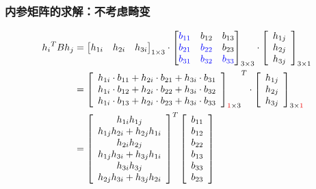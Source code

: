 \documentclass[aspectratio=43]{beamer}
\begin{document}
	\begin{frame}
		\frametitle{内参矩阵的求解：不考虑畸变}
		\begin{align}
			{h_i}^TBh_j&=\left[ \begin{matrix}
				h_{1i}&		h_{2i}&		h_{3i}\\
			\end{matrix} \right] _{1\times 3}\cdot \left[ \begin{matrix}
				{\color{blue} b_{11}}&		b_{12}&		b_{13}\\
				{\color{blue} b_{21}}&		{\color{blue} b_{22}}&		b_{23}\\
				{\color{blue} b_{31}}&		{\color{blue} b_{32}}&		{\color{blue} b_{33}}\\
			\end{matrix} \right] _{3\times 3}\cdot \left[ \begin{array}{c}
				h_{1j}\\
				h_{2j}\\
				h_{3j}\\
			\end{array} \right] _{3\times 1} \nonumber
			\\
			&	={\left[ \begin{array}{c}
					h_{1i}\cdot b_{11}+h_{2i}\cdot b_{21}+h_{3i}\cdot b_{31}\\
					h_{1i}\cdot b_{12}+h_{2i}\cdot b_{22}+h_{3i}\cdot b_{32}\\
					h_{1i}\cdot b_{13}+h_{2i}\cdot b_{23}+h_{3i}\cdot b_{33}\\
				\end{array} \right] _{{\color[RGB]{240, 0, 0} 1}\times 3}}^T\cdot \left[ \begin{array}{c}
				h_{1j}\\
				h_{2j}\\
				h_{3j}\\
			\end{array} \right] _{3\times {\color[RGB]{240, 0, 0} 1}} \nonumber
			\\
			&	=\left[ \begin{array}{c}
				h_{1i}h_{1j}\\
				h_{1j}h_{2i}+h_{2j}h_{1i}\\
				h_{2i}h_{2j}\\
				h_{1j}h_{3i}+h_{3j}h_{1i}\\
				h_{3i}h_{3j}\\
				h_{2j}h_{3i}+h_{3j}h_{2i}\\
			\end{array} \right] ^T\left[ \begin{array}{c}
				b_{11}\\
				b_{12}\\
				b_{22}\\
				b_{13}\\
				b_{33}\\
				b_{23}\\
			\end{array} \right] \label{内参矩阵的求解-hb-vb代换}
		\end{align}
	\end{frame}	
	
\end{document}
